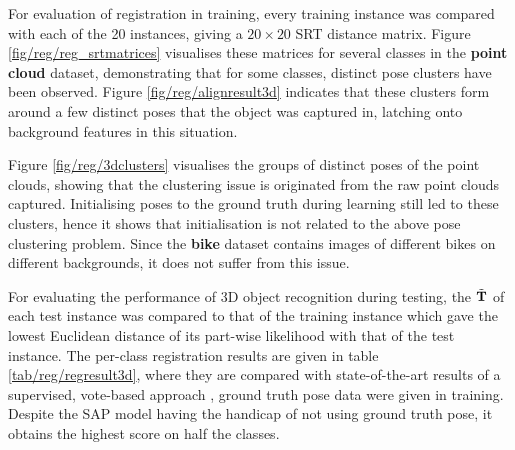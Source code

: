 For evaluation of registration in training, every training instance was compared with each of the 20 instances, giving a $20 \times 20$ SRT distance matrix. Figure \ref{fig/reg/reg_srtmatrices} visualises these matrices for several classes in the \textbf{point cloud} dataset, demonstrating that for some classes, distinct pose clusters have been observed. Figure \ref{fig/reg/alignresult3d} indicates that these clusters form around a few distinct poses that the object was captured in, latching onto background features in this situation. 

Figure \ref{fig/reg/3dclusters} visualises the groups of distinct poses of the point clouds, showing that the clustering issue is originated from the raw point clouds captured. Initialising poses to the ground truth during learning still led to these clusters, hence it shows that initialisation is not related to the above pose clustering problem. Since the \textbf{bike} dataset contains images of different bikes on different backgrounds, it does not suffer from this issue.

For evaluating the performance of 3D object recognition during testing, the $\tilde{\mathbf{T}}$ of each test instance was compared to that of the training instance which gave the lowest Euclidean distance of its part-wise likelihood with that of the test instance. The per-class registration results are given in table \ref{tab/reg/regresult3d}, where they are compared with state-of-the-art results of a supervised, vote-based approach \cite{Woodford2013}, \ie ground truth pose data were given in training. Despite the SAP model having the handicap of not using ground truth pose, it obtains the highest score on half the classes.

